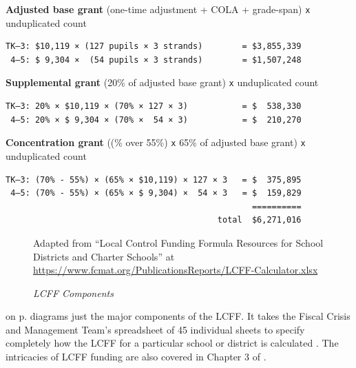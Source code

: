 \noindent\textbf{Adjusted base grant} \hfill{}(one-time adjustment + COLA + grade-span) \texttt{x} unduplicated count
\OnehalfSpacing%
\begin{verbatim}
TK–3: $10,119 × (127 pupils × 3 strands)        = $3,855,339
 4–5: $ 9,304 ×  (54 pupils × 3 strands)        = $1,507,248
\end{verbatim}
\noindent\textbf{Supplemental grant} \hfill(20\% of adjusted base grant) \texttt{x} unduplicated count
\OnehalfSpacing%
\begin{verbatim}
TK–3: 20% × $10,119 × (70% × 127 × 3)           = $  538,330
 4–5: 20% × $ 9,304 × (70% ×  54 × 3)           = $  210,270
\end{verbatim}
\noindent\textbf{Concentration grant} \hfill{}((\% over 55\%) \texttt{x} 65\% of adjusted base grant) \texttt{x} unduplicated count
\OnehalfSpacing%
\begin{verbatim}
TK–3: (70% - 55%) × (65% × $10,119) × 127 × 3   = $  375,895
 4–5: (70% - 55%) × (65% × $ 9,304) ×  54 × 3   = $  159,829
                                                  ==========
                                           total  $6,271,016
\end{verbatim}
\DoubleSpacing

\begin{figure}[ht]
  \noindent%
  \caption[LCFF Components]{\textit{LCFF Components}}\label{fig:lcff_components}%
  {Adapted from ``Local Control Funding Formula Resources for School Districts and Charter Schools'' at  \url{https://www.fcmat.org/PublicationsReports/LCFF-Calculator.xlsx}}
\end{figure}

 on p.\pageref{fig:lcff_components} diagrams just the major components of the LCFF. It takes the Fiscal Crisis and Management Team's spreadsheet of 45 individual sheets to specify completely how the LCFF for a particular school or district is calculated \parencite{FCMAT2024}. The intricacies of LCFF funding are also covered in Chapter 3 of \textcite[35–58]{Aguinaldo.etal2022}.

